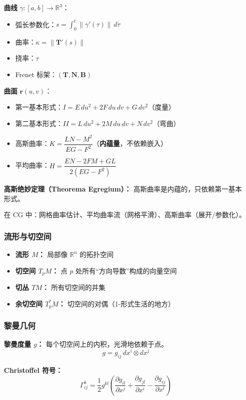 \textbf{曲线} $\gamma: [a,b] \to \mathbb{R}^3$：
\begin{itemize}
  \item 弧长参数化：$s = \int_0^t \|\gamma'(\tau)\|\,d\tau$
  \item 曲率：$\kappa = \|\mathbf{T}'(s)\|$
  \item 挠率：$\tau$
  \item Frenet 标架：$(\mathbf{T}, \mathbf{N}, \mathbf{B})$
\end{itemize}

\textbf{曲面} $\mathbf{r}(u,v)$：
\begin{itemize}
  \item 第一基本形式：$I = E\,du^2 + 2F\,du\,dv + G\,dv^2$（度量）
  \item 第二基本形式：$II = L\,du^2 + 2M\,du\,dv + N\,dv^2$（弯曲）
  \item 高斯曲率：$K = \dfrac{LN - M^2}{EG - F^2}$（\textbf{内蕴量}，不依赖嵌入）
  \item 平均曲率：$H = \dfrac{EN - 2FM + GL}{2(EG - F^2)}$
\end{itemize}

\textbf{高斯绝妙定理（Theorema Egregium）：} 高斯曲率是内蕴的，只依赖第一基本形式。

在 CG 中：网格曲率估计、平均曲率流（网格平滑）、高斯曲率（展开/参数化）。

\subsubsection{流形与切空间}

\begin{itemize}
  \item \textbf{流形 $M$：} 局部像 $\mathbb{R}^n$ 的拓扑空间
  \item \textbf{切空间 $T_pM$：} 点 $p$ 处所有“方向导数”构成的向量空间
  \item \textbf{切丛 $TM$：} 所有切空间的并集
  \item \textbf{余切空间 $T_p^*M$：} 切空间的对偶（1-形式生活的地方）
\end{itemize}

\subsubsection{黎曼几何}

\textbf{黎曼度量 $g$：} 每个切空间上的内积，光滑地依赖于点。
\[
g = g_{ij}\,dx^i \otimes dx^j
\]

\textbf{Christoffel 符号：}
\[
\Gamma^k_{ij} = \frac{1}{2}g^{kl}\left(\frac{\partial g_{il}}{\partial x^j} + \frac{\partial g_{jl}}{\partial x^i} - \frac{\partial g_{ij}}{\partial x^l}\right)
\]

